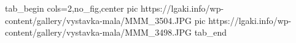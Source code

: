  
 
 
 
 


\ifcmt
  tab_begin cols=2,no_fig,center
     pic https://lgaki.info/wp-content/gallery/vystavka-mala/MMM_3504.JPG
		 pic https://lgaki.info/wp-content/gallery/vystavka-mala/MMM_3498.JPG
  tab_end
\fi
